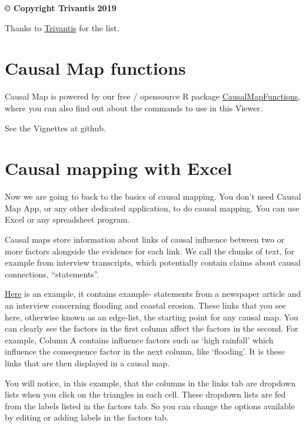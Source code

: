 \documentclass[
]{book}
\begin{document}
\textbf{© Copyright Trivantis} \textbf{2019}

Thanks to \href{https://www.trivantis.com/help/Lectora_Online/4.8/en/HelpHTMLs/Content/16.html}{Trivantis} for the list.

\hypertarget{causal-map-functions}{%
\chapter{Causal Map functions}\label{causal-map-functions}}

Causal Map is powered by our free / opensource R package \href{https://stevepowell99.github.io/CausalMapFunctions/}{CausalMapFunctions}, where you can also find out about the commands to use in this Viewer.

See the Vignettes at github.

\hypertarget{xexcel}{%
\chapter{Causal mapping with Excel}\label{xexcel}}

Now we are going to back to the basics of causal mapping. You don't need Causal Map App, or any other dedicated application, to do causal mapping. You can use Excel or any spreadsheet program.

Causal maps store information about links of causal influence between two or more factors alongside the evidence for each link. We call the chunks of text, for example from interview transcripts, which potentially contain claims about causal connections, ``statements''.

\href{https://docs.google.com/spreadsheets/d/12eXQDJtvlLO6qRrwbxwvkchfdTNLSbjo/edit?usp=sharing\&ouid=112812082380437768869\&rtpof=true\&sd=true}{Here} is an example, it contains example- statements from a newspaper article and an interview concerning flooding and coastal erosion. These links that you see here, otherwise known as an edge-list, the starting point for any causal map. You can clearly see the factors in the first column affect the factors in the second. For example, Column A contains influence factors such as `high rainfall' which influence the consequence factor in the next column, like `flooding'. It is these links that are then displayed in a causal map.

You will notice, in this example, that the columns in the links tab are dropdown lists when you click on the triangles in each cell. These dropdown lists are fed from the labels listed in the factors tab. So you can change the options available by editing or adding labels in the factors tab.
\end{document}
